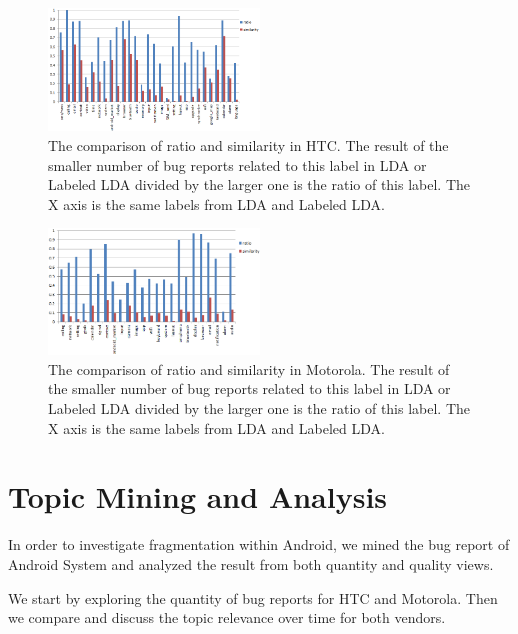 \documentclass[10pt, conference, compsocconf]{IEEEtran}
\begin{document}
\begin{figure}[htb]
\centering
\includegraphics[width=0.5\textwidth]{htcratiosim.png}
\caption{The comparison of ratio and similarity in HTC. The result of the smaller number of bug reports related to this label in LDA or Labeled LDA divided by the larger one is the ratio of this label. The X axis is the same labels from LDA and Labeled LDA.}
\end{figure}

\begin{figure}[htb]
\centering
\includegraphics[width=0.5\textwidth]{motoratiosim.png}
\caption{The comparison of ratio and similarity in Motorola. The result of the smaller number of bug reports related to this label in LDA or Labeled LDA divided by the larger one is the ratio of this label. The X axis is the same labels from LDA and Labeled LDA.}
\end{figure}


\section{Topic Mining and Analysis}

In order to investigate fragmentation within Android, we mined the bug report of Android System and analyzed the result from both quantity and quality views. 

We start by exploring the quantity of bug reports for HTC and Motorola. Then we compare and discuss the topic relevance over time for both vendors.
\end{document}
